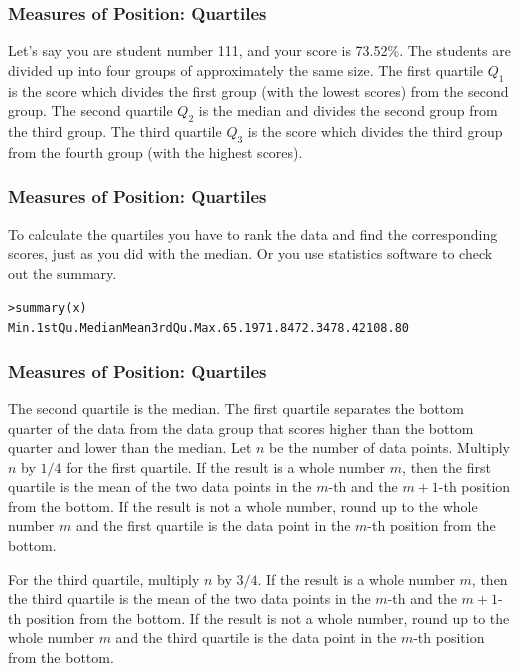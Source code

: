 \documentclass[xcolor=dvipsnames]{beamer}
\begin{document}
\begin{frame}
  \frametitle{Measures of Position: Quartiles}
  Let's say you are student number 111, and your score is 73.52\%. The
  students are divided up into four groups of approximately the same
  size. The first quartile $Q_{1}$ is the score which divides the
  first group (with the lowest scores) from the second group. The
  second quartile $Q_{2}$ is the median and divides the second group
  from the third group. The third quartile $Q_{3}$ is the score which divides the
  third group from the fourth group (with the highest scores). 
\end{frame}

\begin{frame}
  \frametitle{Measures of Position: Quartiles}
  To calculate the quartiles you have to rank the data and find the
  corresponding scores, just as you did with the median. Or you use
  statistics software to check out the summary.
\begin{alltt}
> summary(x)\newline
   Min. 1st Qu.  Median    Mean 3rd Qu.    Max.    65.19   71.84   72.34   78.42  108.80 
\end{alltt}
\end{frame}

\begin{frame}
  \frametitle{Measures of Position: Quartiles}
  The second quartile is the median. The first quartile separates the
  bottom quarter of the data from the data group that scores higher
  than the bottom quarter and lower than the median. Let $n$ be the
  number of data points. Multiply $n$ by $1/4$ for the first quartile.
  If the result is a whole number $m$, then the first quartile is the
  mean of the two data points in the $m$-th and the $m+1$-th position
  from the bottom. If the result is not a whole number, round up to
  the whole number $m$ and the first quartile is the data point in the
  $m$-th position from the bottom.

  For the third quartile, multiply $n$ by $3/4$.
  If the result is a whole number $m$, then the third quartile is the
  mean of the two data points in the $m$-th and the $m+1$-th position
  from the bottom. If the result is not a whole number, round up to
  the whole number $m$ and the third quartile is the data point in the
  $m$-th position from the bottom.
\end{frame}
\end{document}
